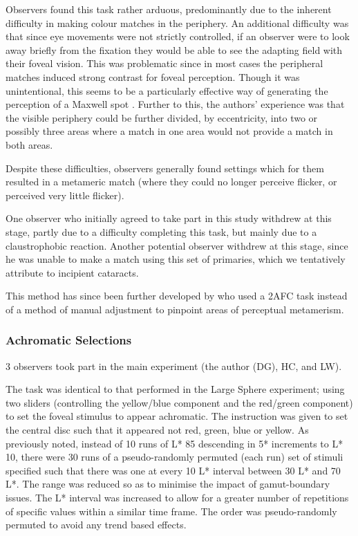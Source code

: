 Observers found this task rather arduous, predominantly due to the inherent difficulty in making colour matches in the periphery. An additional difficulty was that since eye movements were not strictly controlled, if an observer were to look away briefly from the fixation they would be able to see the adapting field with their foveal vision. This was problematic since in most cases the peripheral matches induced strong contrast for foveal perception. Though it was unintentional, this seems to be a particularly effective way of generating the perception of a Maxwell spot \citep{isobe_functional_1955}. Further to this, the authors' experience was that the visible periphery could be further divided, by eccentricity, into two or possibly three areas where a match in one area would not provide a match in both areas.

Despite these difficulties, observers generally found settings which for them resulted in a metameric match (where they could no longer perceive flicker, or perceived very little flicker). 

One observer who initially agreed to take part in this study withdrew at this stage, partly due to a difficulty completing this task, but mainly due to a claustrophobic reaction. Another potential observer withdrew at this stage, since he was unable to make a match using this set of primaries, which we tentatively attribute to incipient cataracts.

This method has since been further developed by \citet{allen_form_2019} who used a 2AFC task instead of a method of manual adjustment to pinpoint areas of perceptual metamerism.

\subsubsection{Achromatic Selections}

3 observers took part in the main experiment (the author (DG), HC, and LW). 

The task was identical to that performed in the Large Sphere experiment; using two sliders (controlling the yellow/blue component and the red/green component) to set the foveal stimulus to appear achromatic. The instruction was given to set the central disc such that it appeared not red, green, blue or yellow. As previously noted, instead of 10 runs of L* 85 descending in 5* increments to L* 10, there were 30 runs of a pseudo-randomly permuted (each run) set of stimuli specified such that there was one at every 10 L* interval between 30 L* and 70 L*. The range was reduced so as to minimise the impact of gamut-boundary issues. The L* interval was increased to allow for a greater number of repetitions of specific values within a similar time frame. The order was pseudo-randomly permuted to avoid any trend based effects.

